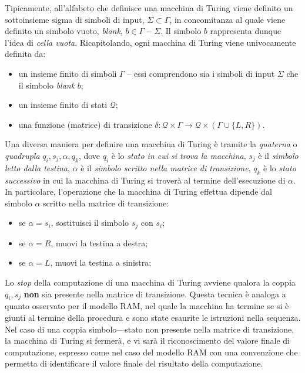 \documentclass[10pt]{book}
\begin{document}
Tipicamente, all'alfabeto che definisce una macchina di Turing viene definito
un sottoinsieme sigma di simboli di input, $\Sigma \subset \Gamma$, in
concomitanza al quale viene definito un simbolo vuoto, \emph{blank}, $b \in
\Gamma - \Sigma$. Il simbolo $b$ rappresenta dunque l'idea di \emph{cella
vuota}. Ricapitolando, ogni macchina di Turing viene univocamente definita da:
\begin{itemize}
    \item un insieme finito di simboli $\Gamma$ \--- essi comprendono sia i
        simboli di input $\Sigma$ che il simbolo \emph{blank} $b$;
    \item un insieme finito di stati $\mathcal Q$;
    \item una funzione (matrice) di transizione $\delta  : \mathcal Q \times
        \Gamma \rightarrow \mathcal Q \times (\Gamma \cup \{L,R\})$.
\end{itemize}

Una diversa maniera per definire una macchina di Turing è tramite la
\emph{quaterna} o \emph{quadrupla} $q_i, s_j, \alpha, q_k$, dove $q_i$ è lo
\emph{stato in cui si trova la macchina}, $s_j$ è il \emph{simbolo letto dalla
testina}, $\alpha$ è il \emph{simbolo scritto nella matrice di transizione}, $q_k$ è
lo \emph{stato successivo} in cui la macchina di Turing si troverà al termine
dell'esecuzione di $\alpha$. In particolare, l'operazione che la macchina di
Turing effettua dipende dal simbolo $\alpha$ scritto nella matrice di
transizione:
\begin{itemize}
    \item se $\alpha = s_i$, sostituisci il simbolo $s_j$ con $s_i$;
    \item se $\alpha = R$, muovi la testina a destra;
    \item se $\alpha = L$, muovi la testina a sinistra;
\end{itemize}

Lo \emph{stop} della computazione di una macchina di Turing avviene qualora la
coppia $q_i, s_j$ \textbf{non} sia presente nella matrice di transizione.
Questa tecnica è analoga a quanto osservato per il modello RAM, nel quale la
macchina ha termine se si è giunti al termine della procedura e sono state
esaurite le istruzioni nella sequenza. Nel caso di una coppia simbolo\----stato
non presente nella matrice di transizione, la macchina di Turing si fermerà, e
vi sarà il riconoscimento del valore finale di computazione, espresso come nel
caso del modello RAM con una convenzione che permetta di identificare il valore
finale del risultato della computazione.
\end{document}
